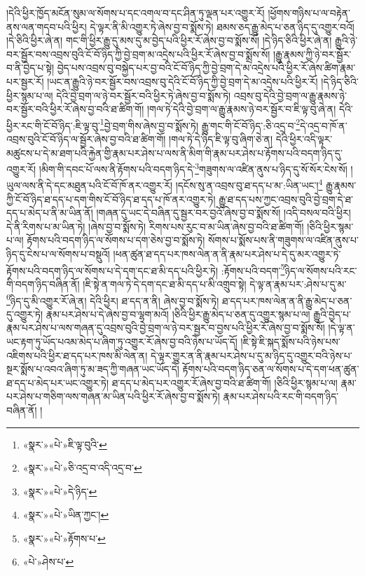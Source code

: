།དེའི་ཕྱིར་ཁྱོད་མངོན་སུམ་ལ་སོགས་པ་དང་འགལ་བ་དང་ཤིན་ཏུ་ལྡན་པར་འགྱུར་རོ། །ཕྱོགས་གཉིས་པ་ལ་བརྟེན་ནས་ལན་གདབ་པའི་ཕྱིར། དེ་ལྟར་ནི་མི་འགྱུར་ཏེ་ཞེས་བྱ་བ་སྨོས་ཏེ། ཐམས་ཅད་རྒྱུ་མེད་པ་ཅན་ཉིད་དུ་འགྱུར་བའོ། །དེ་ཅིའི་ཕྱིར་ཞེ་ན། གང་གི་ཕྱིར་རྒྱུ་དུ་མས་དུ་མ་བྱེད་པའི་ཕྱིར་རོ་ཞེས་བྱ་བ་སྨོས་སོ། །དེ་ཉིད་ཅིའི་ཕྱིར་ཞེ་ན། རྒྱུའི་ཉེ་བར་སྦྱོར་བས་འབྲས་བུའི་ངོ་བོ་ཉིད་ཀྱི་བྱེ་བྲག་མ་འདྲེས་པའི་ཕྱིར་རོ་ཞེས་བྱ་བ་སྨྲོས་སོ། །རྒྱུ་རྣམས་ཀྱི་ཉེ་བར་སྦྱོར་བ་ནི་བྱེད་པ་སྟེ། བྱེད་པས་འབྲས་བུ་བསྐྱེད་པར་བྱ་བའི་ངོ་བོ་ཉིད་ཀྱི་བྱེ་བྲག་དེ་མ་འདྲེས་པའི་ཕྱིར་རོ་ཞེས་ཚིག་རྣམ་པར་སྦྱར་རོ། །ཡང་ན་རྒྱུའི་ཉེ་བར་སྦྱོར་བས་འབྲས་བུ་དེའི་ངོ་བོ་ཉིད་ཀྱི་བྱེ་བྲག་དེ་མ་འདྲེས་པའི་ཕྱིར་རོ། །དེ་ཉིད་ཅིའི་ཕྱིར་སྙམ་པ་ལ། དེའི་བྱེ་བྲག་ལ་ཉེ་བར་སྦྱོར་བའི་ཕྱིར་ཏེ་ཞེས་བྱ་བ་སྨོས་ཏེ། འབྲས་བུ་དེའི་བྱེ་བྲག་ལ་རྒྱུ་རྣམས་ཉེ་བར་སྦྱོར་བའི་ཕྱིར་རོ་ཞེས་བྱ་བའི་ཐ་ཚིག་གོ། །གལ་ཏེ་དེའི་བྱེ་བྲག་ལ་རྒྱུ་རྣམས་ཉེ་བར་སྦྱོར་བ་ཇི་ལྟ་བུ་ཞེ་ན། དེའི་ཕྱིར་རང་གི་ངོ་བོ་ཉིད་:ཇི་ལྟ་བུ་\footnote{«སྣར་»«པེ་»ཇི་ལྟ་བུའི་}བྱེ་བྲག་གིས་ཞེས་བྱ་བ་སྨོས་ཏེ། རྒྱུ་གང་གི་ངོ་བོ་ཉིད་:ཅི་འདྲ་བ་\footnote{«སྣར་»«པེ་»ཅི་འདྲ་བ་འདི་འདྲ་བ་}དེ་འདྲ་བ་ཁོ་ན་འབྲས་བུའི་ངོ་བོ་ཉིད་ལ་སྦྱོར་ཞེས་བྱ་བའི་ཐ་ཚིག་གོ། །གལ་ཏེ་དེ་ཉིད་ཇི་ལྟ་བུ་ཞིག་ཅེ་ན། དེའི་ཕྱིར་འདི་ལྟར་མཚུངས་པ་དེ་མ་ཐག་པའི་རྐྱེན་གྱི་རྣམ་པར་ཤེས་པ་ལས་ནི་མིག་གི་རྣམ་པར་ཤེས་པ་རྟོགས་པའི་བདག་ཉིད་དུ་འགྱུར་རོ། །མིག་གི་དབང་པོ་ལས་ནི་རྟོགས་པའི་བདག་ཉིད་དེ་\footnote{«སྣར་»«པེ་»དེ་ཉིད་}གཟུགས་ལ་འཛིན་ནུས་པ་ཉིད་དུ་སོ་སོར་ངེས་སོ། །ཡུལ་ལས་ནི་དེ་དང་མཐུན་པའི་ངོ་བོ་ཁོ་ནར་འགྱུར་རོ། །དངོས་སུ་ན་འབྲས་བུ་ཐ་དད་པ་མ་:ཡིན་ཡང་།\footnote{«སྣར་»«པེ་»ཡིན་ཀྱང་།} རྒྱུ་རྣམས་ཀྱི་ངོ་བོ་ཉིད་ཐ་དད་པ་དག་གིས་ངོ་བོ་ཉིད་ཐ་དད་པ་ཁོ་ནར་འགྱུར་ཏེ། རྒྱུ་ཐ་དད་པས་ཀྱང་འབྲས་བུའི་བྱེ་བྲག་དེ་ཐ་དད་པ་མེད་པ་ནི་མ་ཡིན་ནོ། །གཞན་དུ་ཡང་དེ་བཞིན་དུ་སྦྱར་བར་བྱའོ་ཞེས་བྱ་བ་སྨོས་སོ། །འདི་བསལ་བའི་ཕྱིར། དེ་ནི་རིགས་པ་མ་ཡིན་ཏེ། །ཞེས་བྱ་བ་སྨོས་ཏེ། རིགས་པས་རུང་བ་མ་ཡིན་ཞེས་བྱ་བའི་ཐ་ཚིག་གོ། །ཅིའི་ཕྱིར་སྙམ་པ་ལ། རྟོགས་པའི་བདག་ཉིད་ལ་སོགས་པ་དག་ཅེས་བྱ་བ་སྨོས་ཏེ། སོགས་པ་སྨོས་པས་ནི་གཟུགས་ལ་འཛིན་ནུས་པ་ཉིད་དུ་ངེས་པ་ལ་སོགས་པ་བསྡུའོ། །ཕན་ཚུན་ཐ་དད་པར་ཁས་ལེན་ན་ནི་རྣམ་པར་ཤེས་པ་དེ་དུ་མར་འགྱུར་ཏེ་རྟོགས་པའི་བདག་ཉིད་ལ་སོགས་པ་དེ་དག་དང་ཐ་མི་དད་པའི་ཕྱིར་ཏེ། :རྟོགས་པའི་བདག་\footnote{«སྣར་»«པེ་»རྟོགས་པ་}ཉིད་ལ་སོགས་པའི་རང་གི་བདག་ཉིད་བཞིན་ནོ། །ཇི་སྟེ་ན་གལ་ཏེ་དེ་དག་དང་ཐ་མི་དད་པ་མི་འགྲུབ་སྟེ། དེ་ལྟ་ན་རྣམ་པར་:ཤེས་པ་དུ་མ་\footnote{«པེ་»ཤེས་པ་}ཉིད་དུ་མི་འགྱུར་རོ་ཞེ་ན། དེའི་ཕྱིར། ཐ་དད་ན་ནི། ཞེས་བྱ་བ་སྨོས་ཏེ། ཐ་དད་པར་ཁས་ལེན་ན་ནི་རྒྱུ་མེད་པ་ཅན་དུ་འགྱུར་ཏེ། རྣམ་པར་ཤེས་པ་དེ་ཞེས་བྱ་བ་ལྷག་མའོ། །ཅིའི་ཕྱིར་རྒྱུ་མེད་པ་ཅན་དུ་འགྱུར་སྙམ་པ་ལ། རྒྱུའི་བྱེད་པ་རྣམ་པར་ཤེས་པ་ལས་གཞན་དུ་འབྲས་བུའི་བྱེ་བྲག་ལ་ཉེ་བར་སྦྱར་བ་བྱས་པའི་ཕྱིར་རོ་ཞེས་བྱ་བ་སྨོས་སོ། །དེ་ལྟ་ན་ཡང་རྟག་ཏུ་ཡོད་པའམ་མེད་པ་ཞིག་ཏུ་འགྱུར་རོ་ཞེས་བྱ་བའི་ཉེས་པ་ཡོད་དོ། །ཇི་སྟེ་ཇི་སྐད་སྨོས་པའི་ཉེས་པས་འཇིགས་པའི་ཕྱིར་ཐ་དད་པར་ཁས་མི་ལེན་ན། དེ་ལྟར་གྱུར་ན་ནི་རྣམ་པར་ཤེས་པ་དུ་མ་ཉིད་དུ་འགྱུར་བའི་ཉེས་པ་སྔར་སྨོས་པ་འབའ་ཞིག་ཏུ་མ་ཟད་ཀྱི་གཞན་ཡང་ཡོད་དེ། རྟོགས་པའི་བདག་ཉིད་ཅན་ལ་སོགས་པ་དེ་དག་ཕན་ཚུན་ཐ་དད་པ་མེད་པར་ཡང་འགྱུར་ཏེ། ཐ་དད་པ་མེད་པར་འགྱུར་རོ་ཞེས་བྱ་བའི་ཐ་ཚིག་གོ། །ཅིའི་ཕྱིར་སྙམ་པ་ལ། རྣམ་པར་ཤེས་པ་གཅིག་ལས་གཞན་མ་ཡིན་པའི་ཕྱིར་རོ་ཞེས་བྱ་བ་སྨོས་ཏེ། རྣམ་པར་ཤེས་པའི་རང་གི་བདག་ཉིད་བཞིན་ནོ། །
